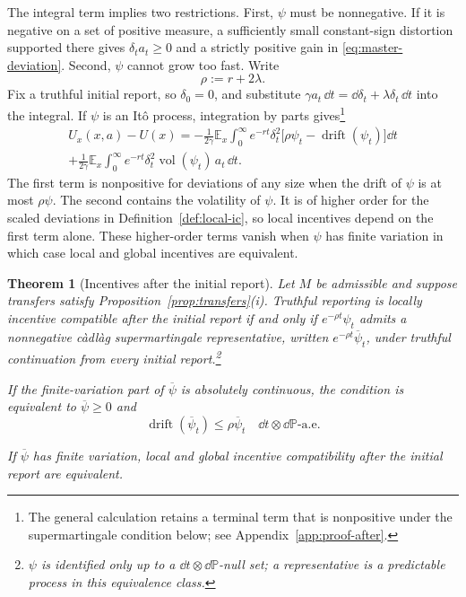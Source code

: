 \documentclass[12pt]{article}
\newtheorem{subthm}{Theorem}
\newcommand{\nexttheoremset}{\refstepcounter{theorem}\setcounter{subthm}{0}}
\DeclareMathOperator{\drift}{drift}
\DeclareMathOperator{\vol}{vol}
\newcommand{\E}{\mathbb{E}}
\begin{document}
The integral term implies two restrictions. 
First, \(\psi\) must be nonnegative. If it is negative on a set of positive measure, a sufficiently
small constant-sign distortion supported there gives
\(\delta_ta_t\geq0\) and a strictly positive gain in
\eqref{eq:master-deviation}.
Second, \(\psi\) cannot grow too
fast. Write
\[
  \rho:=r+2\lambda.
\]
Fix a truthful initial report, so \(\delta_0=0\), and substitute
\(\gamma a_t\,\dd t=\dd\delta_t+\lambda\delta_t\,\dd t\) into the integral. If \(\psi\)
is an It\^o process, integration by parts gives\footnote{The general calculation
retains a terminal term that is nonpositive under the supermartingale
condition below; see Appendix~\ref{app:proof-after}.}
\begin{multline}\label{eq:second-order}
  U_x(x,a)-U(x)
  =
  -\frac{1}{2\gamma}
  \E_x\!\int_0^\infty e^{-rt}\delta_t^2
  \bigl[\rho\psi_t-\drift(\psi_t)\bigr]\dd t\\
  +\frac{1}{2\gamma}
  \E_x\!\int_0^\infty e^{-rt}\delta_t^2
  \vol(\psi_t)\,a_t\,\dd t.
\end{multline}
The first term is nonpositive for deviations of any size when the
drift of \(\psi\) is at most \(\rho\psi\). The second contains the
volatility of \(\psi\). It is of higher order for the scaled deviations
in Definition~\ref{def:local-ic}, so local incentives
depend on the first term alone. These higher-order terms vanish when \(\psi\) has finite
variation in which case local and global incentives are equivalent.

\nexttheoremset

\begin{subthm}[Incentives after the initial report]\label{thm:after}
Let \(M\) be admissible and suppose transfers satisfy
Proposition~\ref{prop:transfers}\textnormal{(i)}. Truthful reporting is
locally incentive compatible after the initial report if and only if
\(e^{-\rho t}\psi_t\) admits a nonnegative c\`adl\`ag supermartingale
representative, written \(e^{-\rho t}\overline{\psi}_t\), under
truthful continuation from every initial report.\footnote{\(\psi\) is
identified only up to a \(\dd t\otimes\dd\mathbb P\)-null set; a
representative is a predictable process in this equivalence class.}

If the finite-variation part of \(\overline{\psi}\) is absolutely
continuous, the condition is equivalent to \(\overline{\psi}\geq0\) and
\[
  \drift(\overline{\psi}_t)\leq\rho\overline{\psi}_t
  \quad
  \dd t\otimes\dd\mathbb P\text{-a.e.}
\]

If \(\overline{\psi}\) has finite variation, local and global incentive
compatibility after the initial report are equivalent.
\end{subthm}
\end{document}
